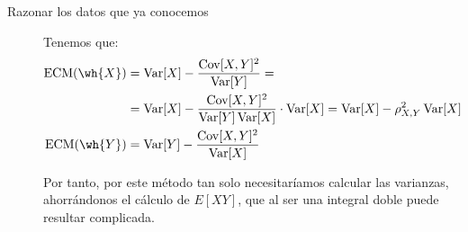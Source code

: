 \begin{ejercicio}
\begin{enumerate}
\begin{description}
            \item[Razonar los datos que ya conocemos] Tenemos que:
            \begin{align*}
                \text{ECM}(\wh{X}) &= \Var[X] - \dfrac{\Cov[X,Y]^2}{\Var[Y]}
                =\\&=  \Var[X] - \dfrac{\Cov[X,Y]^2}{\Var[Y]\Var[X]}\cdot \Var[X]
                = \Var[X] - \rho_{X,Y}^2\Var[X]\\
                \text{ECM}(\wh{Y}) &= \Var[Y] - \dfrac{\Cov[X,Y]^2}{\Var[X]}
            \end{align*}

            Por tanto, por este método tan solo necesitaríamos calcular las varianzas, ahorrándonos el cálculo de $E[XY]$, que al ser una integral doble puede resultar complicada.
        \end{description}
    \end{enumerate}
\end{ejercicio}

